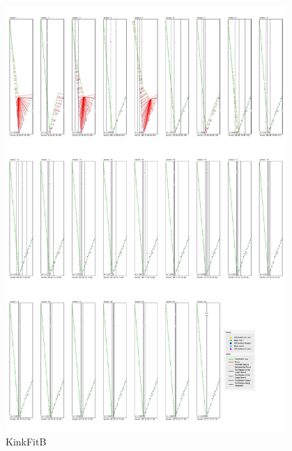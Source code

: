 \begin{figure}[h!]
  \centering
    \includegraphics[width=0.95\textwidth]{Chapter4/Figs/KinkFit_B.jpg}
    \caption{KinkFitB}\label{fig:KinkFitB}
\end{figure}

